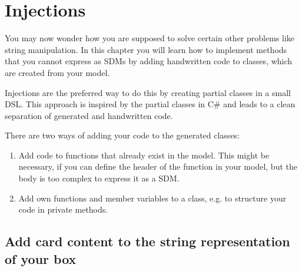 \section{Injections}
\label{sec:intro_injections}

You may now wonder how you are supposed to solve certain other problems like string manipulation. In this chapter you will learn how to implement methods that you cannot express as SDMs by adding handwritten code to classes, which are created from your model.

Injections are the preferred way to do this by creating partial classes in a small DSL. This approach is inspired by the partial classes in C\# and leads to a clean separation of generated and handwritten code.

There are two ways of adding your code to the generated classes:

\begin{enumerate}
    \item Add code to functions that already exist in the model. This might be necessary, if you can define the header of the function in your model, but the body is too complex to express it as a SDM.
    \item Add own functions and member variables to a class, e.g. to structure your code in private methods.
\end{enumerate}

\subsection{Add card content to the string representation of your box}

